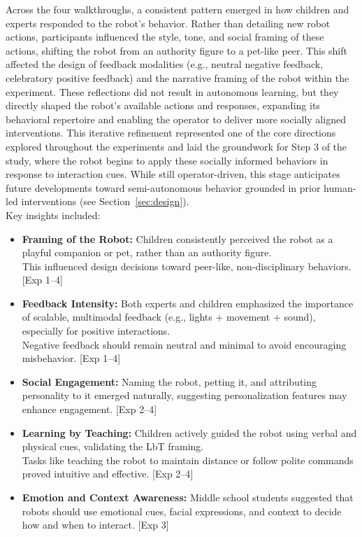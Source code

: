 \documentclass[a4paper]{usiinfbachelorproject}
\begin{document}
Across the four walkthroughs, a consistent pattern emerged in how children and experts responded to the robot's behavior.
Rather than detailing new robot actions, participants influenced the style, tone, and social framing of these actions, shifting the robot from an authority figure to a pet-like peer.
This shift affected the design of feedback modalities (e.g., neutral negative feedback, celebratory positive feedback) and the narrative framing of the robot within the experiment.
These reflections did not result in autonomous learning, but they directly shaped the robot's available actions and responses,
expanding its behavioral repertoire and enabling the operator to deliver more socially aligned interventions.
This iterative refinement represented one of the core directions explored throughout the experiments and laid the groundwork for Step 3 of the study,
where the robot begins to apply these socially informed behaviors in response to interaction cues.
While still operator-driven, this stage anticipates future developments toward semi-autonomous behavior grounded in prior human-led interventions (see Section~\ref{sec:design}).
\\
Key insights included:
\begin{itemize}
    \item \textbf{Framing of the Robot:} Children consistently perceived the robot as a playful companion or pet, rather than an authority figure.\\
          This influenced design decisions toward peer-like, non-disciplinary behaviors. [Exp 1--4]
    \item \textbf{Feedback Intensity:} Both experts and children emphasized the importance of scalable, multimodal feedback (e.g., lights + movement + sound), especially for positive interactions.\\
          Negative feedback should remain neutral and minimal to avoid encouraging misbehavior. [Exp 1--4]
    \item \textbf{Social Engagement:} Naming the robot, petting it, and attributing personality to it emerged naturally, suggesting personalization features may enhance engagement. [Exp 2--4]
    \item \textbf{Learning by Teaching:} Children actively guided the robot using verbal and physical cues, validating the LbT framing.\\
          Tasks like teaching the robot to maintain distance or follow polite commands proved intuitive and effective. [Exp 2--4]
    \item \textbf{Emotion and Context Awareness:} Middle school students suggested that robots should use emotional cues, facial expressions, and context to decide how and when to interact. [Exp 3]
\end{itemize}
\end{document}
